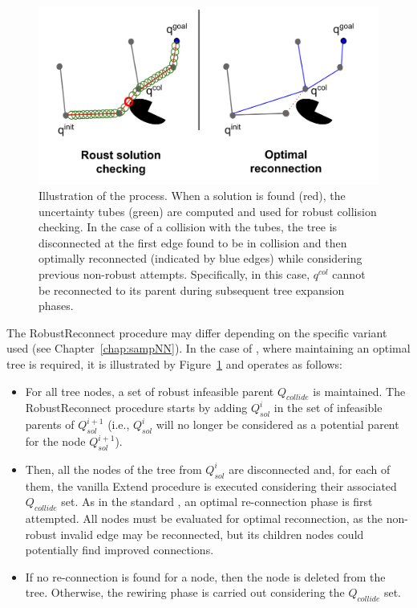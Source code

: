 \begin{figure} [h!]
    \centering
    \includegraphics[width=0.8\linewidth]{figures/samp/lazyrrtstar.png} 
    \caption{Illustration of the  process.
    When a solution is found (red), the uncertainty tubes (green) are computed and used for robust collision checking.
    In the case of a collision with the tubes, the tree is disconnected at the first edge found to be in collision and then optimally reconnected (indicated by blue edges) while considering previous non-robust attempts. 
    Specifically, in this case, $q^{col}$ cannot be reconnected to its parent during subsequent tree expansion phases.
    }%
    \label{fig:lazysarrt*}%
\end{figure}

The RobustReconnect procedure may differ depending on the specific  variant used (see Chapter~\ref{chap:sampNN}). 
In the case of , where maintaining an optimal tree is required, it is illustrated by Figure~\ref{fig:lazysarrt*} and operates as follows:
\begin{itemize}
    \item For all tree nodes, a set of robust infeasible parent $Q_{collide}$ is maintained. 
    The RobustReconnect procedure starts by adding $Q_{sol}^i$ in the set of infeasible parents of $Q_{sol}^{i+1}$ (i.e., $Q_{sol}^i$ will no longer be considered as a potential parent for the node $Q_{sol}^{i+1}$).
    \item Then, all the nodes of the tree from $Q_{sol}^i$ are disconnected and, for each of them, the vanilla Extend procedure is executed considering their associated $Q_{collide}$ set.
    As in the standard , an optimal re-connection phase is first attempted.
    All nodes must be evaluated for optimal reconnection, as the non-robust invalid edge may be reconnected, but its children nodes could potentially find improved connections.
    \item If no re-connection is found for a node, then the node is deleted from the tree. 
    Otherwise, the rewiring phase is carried out considering the $Q_{collide}$ set.
\end{itemize}

